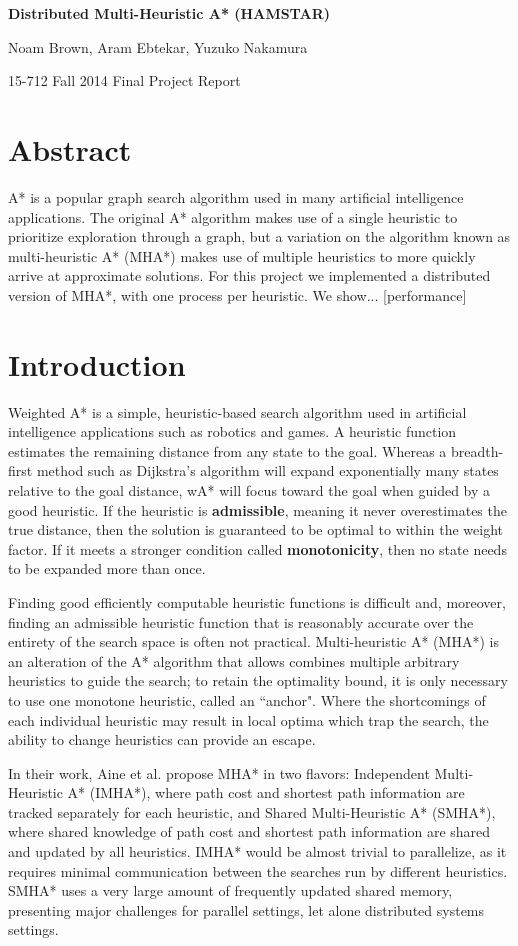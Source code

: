 \documentclass{article}
\begin{document}
\centerline{\Large{\textbf{Distributed Multi-Heuristic A* (HAMSTAR)}}}
\centerline{Noam Brown, Aram Ebtekar, Yuzuko Nakamura}
\centerline{15-712 Fall 2014 Final Project Report}

\section{Abstract}

A* is a popular graph search algorithm used in many artificial intelligence applications. The original A* algorithm makes use of a single heuristic to prioritize exploration through a graph, but a variation on the algorithm known as multi-heuristic A* (MHA*) makes use of multiple heuristics to more quickly arrive at approximate solutions. For this project we implemented a distributed version of MHA*, with one process per heuristic. We show... [performance]

\section{Introduction}

Weighted A* is a simple, heuristic-based search algorithm used in artificial intelligence applications such as robotics and games. A heuristic function estimates the remaining distance from any state to the goal. Whereas a breadth-first method such as Dijkstra's algorithm will expand exponentially many states relative to the goal distance, wA* will focus toward the goal when guided by a good heuristic. If the heuristic is \textbf{admissible}, meaning it never overestimates the true distance, then the solution is guaranteed to be optimal to within the weight factor. If it meets a stronger condition called \textbf{monotonicity}, then no state needs to be expanded more than once.

Finding good efficiently computable heuristic functions is difficult and, moreover, finding an admissible heuristic function that is reasonably accurate over the entirety of the search space is often not practical. Multi-heuristic A* (MHA*) \cite{Aine14} is an alteration of the A* algorithm that allows combines multiple arbitrary heuristics to guide the search; to retain the optimality bound, it is only necessary to use one monotone heuristic, called an ``anchor". Where the shortcomings of each individual heuristic may result in local optima which trap the search, the ability to change heuristics can provide an escape.

In their work, Aine et al. propose MHA* in two flavors: Independent Multi-Heuristic A* (IMHA*), where path cost and shortest path information are tracked separately for each heuristic, and Shared Multi-Heuristic A* (SMHA*), where shared knowledge of path cost and shortest path information are shared and updated by all heuristics. IMHA* would be almost trivial to parallelize, as it requires minimal communication between the searches run by different heuristics. SMHA* uses a very large amount of frequently updated shared memory, presenting major challenges for parallel settings, let alone distributed systems settings.
\end{document}
